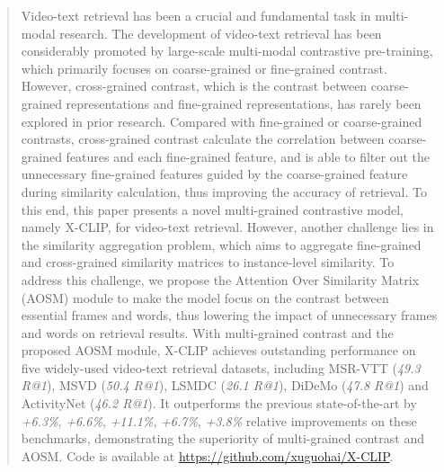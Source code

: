 \documentclass[sigconf]{acmart}
\begin{document}
\begin{abstract}
  Video-text retrieval has been a crucial and fundamental task in multi-modal research. The development of video-text retrieval has been considerably promoted by large-scale multi-modal contrastive pre-training, which primarily focuses on coarse-grained or fine-grained contrast. However, cross-grained contrast, which is the contrast between coarse-grained representations and fine-grained representations, has rarely been explored in prior research. Compared with fine-grained or coarse-grained contrasts, cross-grained contrast calculate the correlation between coarse-grained features and each fine-grained feature, and is able to filter out the unnecessary fine-grained features guided by the coarse-grained feature during similarity calculation, thus improving the accuracy of retrieval. To this end, this paper presents a novel multi-grained contrastive model, namely X-CLIP, for video-text retrieval. However, another challenge lies in the similarity aggregation problem, which aims to aggregate fine-grained and cross-grained similarity matrices to instance-level similarity. To address this challenge, we propose the Attention Over Similarity Matrix (AOSM) module to make the model focus on the contrast between essential frames and words, thus lowering the impact of unnecessary frames and words on retrieval results. With multi-grained contrast and the proposed AOSM module, X-CLIP achieves outstanding performance on five widely-used video-text retrieval datasets, including MSR-VTT (\emph{49.3 R@1}), MSVD (\emph{50.4 R@1}), LSMDC  (\emph{26.1 R@1}), DiDeMo  (\emph{47.8 R@1}) and ActivityNet (\emph{46.2 R@1}). It outperforms the previous state-of-the-art by \emph{+6.3\%}, \emph{+6.6\%}, \emph{+11.1\%}, \emph{+6.7\%}, \emph{+3.8\%} relative improvements on these benchmarks, demonstrating the superiority of multi-grained contrast and AOSM. Code is available at \url{https://github.com/xuguohai/X-CLIP}.
\end{abstract}

\end{document}
